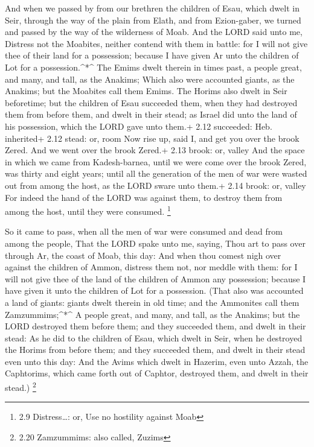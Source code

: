  And when we passed by from our brethren the children of
Esau, which dwelt in Seir, through the way of the plain from Elath, and
from Ezion-gaber, we turned and passed by the way of the wilderness of
Moab.  And the LORD said unto me, Distress not the Moabites,
neither contend with them in battle: for I will not give thee of their
land for a possession; because I have given Ar unto the children of Lot
for a possession.\^{}*\^{}  The Emims dwelt therein in
times past, a people great, and many, and tall, as the Anakims;
 Which also were accounted giants, as the Anakims; but the
Moabites call them Emims.  The Horims also dwelt in Seir
beforetime; but the children of Esau succeeded them, when they had
destroyed them from before them, and dwelt in their stead; as Israel did
unto the land of his possession, which the LORD gave unto them.+ 2.12
succeeded: Heb. inherited+ 2.12 stead: or, room  Now rise
up, said I, and get you over the brook Zered. And we went over the brook
Zered.+ 2.13 brook: or, valley  And the space in which we
came from Kadesh-barnea, until we were come over the brook Zered, was
thirty and eight years; until all the generation of the men of war were
wasted out from among the host, as the LORD sware unto them.+ 2.14
brook: or, valley  For indeed the hand of the LORD was
against them, to destroy them from among the host, until they were
consumed. \footnote{2.9 Distress\ldots: or, Use no hostility against
  Moab}

 So it came to pass, when all the men of war were consumed
and dead from among the people,  That the LORD spake unto
me, saying,  Thou art to pass over through Ar, the coast of
Moab, this day:  And when thou comest nigh over against the
children of Ammon, distress them not, nor meddle with them: for I will
not give thee of the land of the children of Ammon any possession;
because I have given it unto the children of Lot for a possession.
 (That also was accounted a land of giants: giants dwelt
therein in old time; and the Ammonites call them Zamzummims;\^{}*\^{}
 A people great, and many, and tall, as the Anakims; but
the LORD destroyed them before them; and they succeeded them, and dwelt
in their stead:  As he did to the children of Esau, which
dwelt in Seir, when he destroyed the Horims from before them; and they
succeeded them, and dwelt in their stead even unto this day:
 And the Avims which dwelt in Hazerim, even unto Azzah, the
Caphtorims, which came forth out of Caphtor, destroyed them, and dwelt
in their stead.) \footnote{2.20 Zamzummims: also called, Zuzims}

